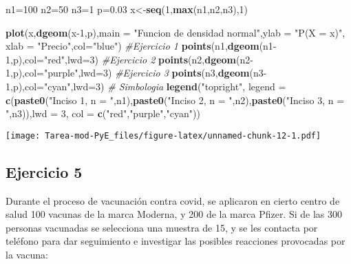 \documentclass[
]{article}
\newenvironment{Shaded}{\begin{snugshade}}{\end{snugshade}}
\newcommand{\AttributeTok}[1]{\textcolor[rgb]{0.13,0.29,0.53}{#1}}
\newcommand{\CommentTok}[1]{\textcolor[rgb]{0.56,0.35,0.01}{\textit{#1}}}
\newcommand{\DecValTok}[1]{\textcolor[rgb]{0.00,0.00,0.81}{#1}}
\newcommand{\FloatTok}[1]{\textcolor[rgb]{0.00,0.00,0.81}{#1}}
\newcommand{\FunctionTok}[1]{\textcolor[rgb]{0.13,0.29,0.53}{\textbf{#1}}}
\newcommand{\NormalTok}[1]{#1}
\newcommand{\OtherTok}[1]{\textcolor[rgb]{0.56,0.35,0.01}{#1}}
\newcommand{\StringTok}[1]{\textcolor[rgb]{0.31,0.60,0.02}{#1}}
\begin{document}
\begin{Shaded}
\begin{Highlighting}[]
\NormalTok{n1}\OtherTok{=}\DecValTok{100}
\NormalTok{n2}\OtherTok{=}\DecValTok{50}
\NormalTok{n3}\OtherTok{=}\DecValTok{1}
\NormalTok{p}\OtherTok{=}\FloatTok{0.03}
\NormalTok{x}\OtherTok{\textless{}{-}}\FunctionTok{seq}\NormalTok{(}\DecValTok{1}\NormalTok{,}\FunctionTok{max}\NormalTok{(n1,n2,n3),}\DecValTok{1}\NormalTok{)}

\FunctionTok{plot}\NormalTok{(x,}\FunctionTok{dgeom}\NormalTok{(x}\DecValTok{{-}1}\NormalTok{,p),}\AttributeTok{main =} \StringTok{"Funcion de densidad normal"}\NormalTok{,}\AttributeTok{ylab =} \StringTok{"P(X = x)"}\NormalTok{, }\AttributeTok{xlab =} \StringTok{"Precio"}\NormalTok{,}\AttributeTok{col=}\StringTok{"blue"}\NormalTok{)}
\CommentTok{\#Ejercicio 1}
\FunctionTok{points}\NormalTok{(n1,}\FunctionTok{dgeom}\NormalTok{(n1}\DecValTok{{-}1}\NormalTok{,p),}\AttributeTok{col=}\StringTok{"red"}\NormalTok{,}\AttributeTok{lwd=}\DecValTok{3}\NormalTok{)}
\CommentTok{\#Ejercicio 2}
\FunctionTok{points}\NormalTok{(n2,}\FunctionTok{dgeom}\NormalTok{(n2}\DecValTok{{-}1}\NormalTok{,p),}\AttributeTok{col=}\StringTok{"purple"}\NormalTok{,}\AttributeTok{lwd=}\DecValTok{3}\NormalTok{)}
\CommentTok{\#Ejercicio 3}
\FunctionTok{points}\NormalTok{(n3,}\FunctionTok{dgeom}\NormalTok{(n3}\DecValTok{{-}1}\NormalTok{,p),}\AttributeTok{col=}\StringTok{"cyan"}\NormalTok{,}\AttributeTok{lwd=}\DecValTok{3}\NormalTok{)}
\CommentTok{\# Simbologia}
\FunctionTok{legend}\NormalTok{(}\StringTok{"topright"}\NormalTok{, }\AttributeTok{legend =} \FunctionTok{c}\NormalTok{(}\FunctionTok{paste0}\NormalTok{(}\StringTok{"Inciso 1, n = "}\NormalTok{,n1),}\FunctionTok{paste0}\NormalTok{(}\StringTok{"Inciso 2, n = "}\NormalTok{,n2),}\FunctionTok{paste0}\NormalTok{(}\StringTok{"Inciso 3, n = "}\NormalTok{,n3)),}\AttributeTok{lwd =} \DecValTok{3}\NormalTok{, }\AttributeTok{col =} \FunctionTok{c}\NormalTok{(}\StringTok{"red"}\NormalTok{,}\StringTok{"purple"}\NormalTok{,}\StringTok{"cyan"}\NormalTok{))}
\end{Highlighting}
\end{Shaded}

\texttt{[image: Tarea-mod-PyE\_files/figure-latex/unnamed-chunk-12-1.pdf]}

\subsection{Ejercicio 5}\label{ejercicio-5}

Durante el proceso de vacunación contra covid, se aplicaron en cierto
centro de salud 100 vacunas de la marca Moderna, y 200 de la marca
Pfizer. Si de las 300 personas vacunadas se selecciona una muestra de
15, y se les contacta por teléfono para dar seguimiento e investigar las
posibles reacciones provocadas por la vacuna:
\end{document}
